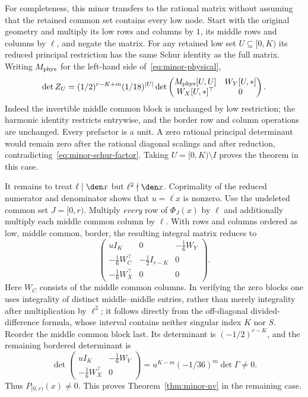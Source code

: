 For completeness, this minor transfers to the rational matrix without
assuming that the retained common set contains every low node.
Start with the original geometry and multiply its low rows and columns
by $1$, its middle rows and columns by $\ell$, and negate the matrix.
For any retained low set $U\subseteq[0,K)$ its reduced principal
restriction has the same Schur identity as the full matrix. Writing
$M_{\rm phys}$ for the left-hand side of~\eqref{eq:minor-physical},
\begin{equation}\label{eq:minor-schur-factor}
 \det Z_U=(1/2)^{r-K+m}(1/18)^{|U|}
 \det\begin{pmatrix}
 M_{\rm phys}[U,U]&W_Y[U,*]\\
 W_X[U,*]^{\top}&0
 \end{pmatrix}.
\end{equation}
Indeed the invertible middle common block is unchanged by low restriction;
the harmonic identity restricts entrywise, and the border row and column
operations are unchanged. Every prefactor is a unit. A zero rational
principal determinant would remain zero after the rational diagonal
scalings and after reduction, contradicting~\eqref{eq:minor-schur-factor}.
Taking $U=[0,K)\setminus I$ proves the theorem in this case.

It remains to treat $\ell\mid\den x$ but $\ell^2\nmid\den x$.
Coprimality of the reduced numerator and denominator shows that
$u=\overline{\ell x}$ is nonzero. Use the undeleted common set $J=[0,r)$.
Multiply \emph{every} row of $\Phi_J(x)$ by $\ell$ and additionally
multiply each middle common column by $\ell$. With rows and columns
ordered as low, middle common, border, the resulting integral matrix
reduces to
\[
 \begin{pmatrix}
 uI_K&0&-\tfrac16W_Y\\
 -\tfrac16W_C^{\top}&-\tfrac12I_{r-K}&0\\
 -\tfrac16W_X^{\top}&0&0
 \end{pmatrix}.
\]
Here $W_C$ consists of the middle common columns. In verifying the zero
blocks one uses integrality of distinct middle--middle entries, rather
than merely integrality after multiplication by $\ell^2$; it follows
directly from the off-diagonal divided-difference formula, whose interval
contains neither singular index $K$ nor $S$.
Reorder the middle common block last. Its determinant is $(-1/2)^{r-K}$,
and the remaining bordered determinant is
\[
 \det\begin{pmatrix}uI_K&-\tfrac16W_Y\\-\tfrac16W_X^{\top}&0\end{pmatrix}
       =u^{K-m}(-1/36)^m\det\Gamma\ne0.
\]
Thus $P_{[0,r)}(x)\ne0$. This proves
Theorem~\ref{thm:minor-nv} in the remaining case.

